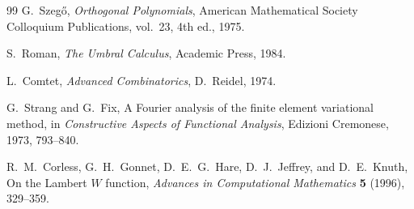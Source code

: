 \documentclass[11pt,oneside]{article}
\theoremstyle{definition}
\theoremstyle{remark}
\begin{document}
\begin{thebibliography}{99}
G.~Szeg\H{o},
\newblock \emph{Orthogonal Polynomials},
\newblock American Mathematical Society Colloquium Publications, vol.~23,
4th ed., 1975.

S.~Roman,
\newblock \emph{The Umbral Calculus},
\newblock Academic Press, 1984.

L.~Comtet,
\newblock \emph{Advanced Combinatorics},
\newblock D.~Reidel, 1974.

G.~Strang and G.~Fix,
\newblock A Fourier analysis of the finite element variational method,
\newblock in \emph{Constructive Aspects of Functional Analysis}, Edizioni
Cremonese, 1973, 793--840.

R.~M.~Corless, G.~H.~Gonnet, D.~E.~G.~Hare, D.~J.~Jeffrey, and D.~E.~Knuth,
\newblock On the Lambert $W$ function,
\newblock \emph{Advances in Computational Mathematics} \textbf{5} (1996),
329--359.

\end{thebibliography}
\end{document}
